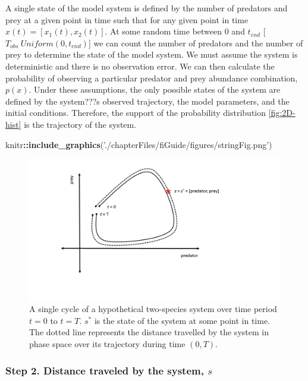 \documentclass[12pt,twoside,openany]{reedthesis}
\newenvironment{Shaded}{\begin{snugshade}}{\end{snugshade}}
\newcommand{\KeywordTok}[1]{\textcolor[rgb]{0.13,0.29,0.53}{\textbf{#1}}}
\newcommand{\StringTok}[1]{\textcolor[rgb]{0.31,0.60,0.02}{#1}}
\newcommand{\OperatorTok}[1]{\textcolor[rgb]{0.81,0.36,0.00}{\textbf{#1}}}
\newcommand{\NormalTok}[1]{#1}
\begin{document}
A single state of the model system is defined by the number of predators
and prey at a given point in time such that for any given point in time
\(x(t)=[x_1 (t),x_2 (t)]\). At some random time between 0 and
\(t_{end}\) {[}\(T_{obs} ~ Uniform(0,t_{end})\){]} we can count the
number of predators and the number of prey to determine the state of the
model system. We must assume the system is deterministic and there is no
observation error. We can then calculate the probability of observing a
particular predator and prey abundance combination, \(p(x)\). Under
these assumptions, the only possible states of the system are defined by
the system???s observed trajectory, the model parameters, and the
initial conditions. Therefore, the support of the probability
distribution \ref{fig:2D-hist} is the trajectory of the system.
\begin{Shaded}
\begin{Highlighting}[]
\NormalTok{knitr}\OperatorTok{::}\KeywordTok{include_graphics}\NormalTok{(}\StringTok{'./chapterFiles/fiGuide/figures/stringFig.png'}\NormalTok{)}
\end{Highlighting}
\end{Shaded}
\begin{figure}
\includegraphics[width=17.78in]{./chapterFiles/fiGuide/figures/stringFig} \caption{A single cycle of a hypothetical two-species system over time period $t = 0$ to $t = T$. $s^*$ is the state of the system at some point in time. The dotted line represents the distance travelled by the system in phase space over its trajectory during time $(0, T)$.}\label{fig:stringFig}
\end{figure}
\subsubsection{\texorpdfstring{\textbf{Step 2.} Distance traveled by the
system,
\(s\)}{Step 2. Distance traveled by the system, s}}\label{step-2.-distance-traveled-by-the-system-s}
\end{document}
